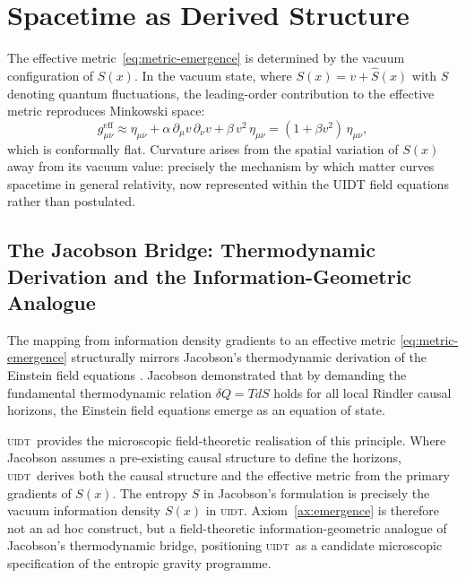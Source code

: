 \documentclass[12pt,a4paper,twoside]{article}
\theoremstyle{plain}
\theoremstyle{definition}
\theoremstyle{remark}
\newcommand{\UIDT}{\textsc{uidt}}
\newcommand{\Sx}{S(x)}
\begin{document}
\newpage

\section{Spacetime as Derived Structure}
\label{sec:spacetime}

The effective metric~\eqref{eq:metric-emergence} is determined by the vacuum
configuration of $\Sx$. In the vacuum state, where $\Sx = v + \hat{S}(x)$
with $\hat{S}$ denoting quantum fluctuations, the leading-order contribution
to the effective metric reproduces Minkowski space:
\begin{equation}
  g_{\mu\nu}^{\mathrm{eff}} \approx \eta_{\mu\nu}
  + \alpha\,\partial_\mu v\,\partial_\nu v
  + \beta\, v^2\, \eta_{\mu\nu}
  = (1 + \beta v^2)\,\eta_{\mu\nu},
\end{equation}
which is conformally flat. Curvature arises from the spatial variation of
$\Sx$ away from its vacuum value: precisely the mechanism by which matter
curves spacetime in general relativity, now represented within the UIDT field
equations rather than postulated.

\subsection{The Jacobson Bridge: Thermodynamic Derivation and the Information-Geometric Analogue}
\label{subsec:jacobson}

The mapping from information density gradients to an effective metric
\eqref{eq:metric-emergence} structurally mirrors Jacobson's thermodynamic
derivation of the Einstein field equations \cite{Jacobson1995}. Jacobson
demonstrated that by demanding the fundamental thermodynamic relation
$\delta Q = T dS$ holds for all local Rindler causal horizons, the Einstein
field equations emerge as an equation of state.

\UIDT\ provides the microscopic field-theoretic realisation of this principle.
Where Jacobson assumes a pre-existing causal structure to define the horizons,
\UIDT\ derives both the causal structure and the effective metric from the
primary gradients of $\Sx$. The entropy $S$ in Jacobson's formulation is
precisely the vacuum information density $\Sx$ in \UIDT.
Axiom~\ref{ax:emergence} is therefore not an ad hoc construct, but a
field-theoretic information-geometric analogue of Jacobson's thermodynamic
bridge, positioning \UIDT\ as a candidate microscopic specification of the
entropic gravity programme.
\end{document}
